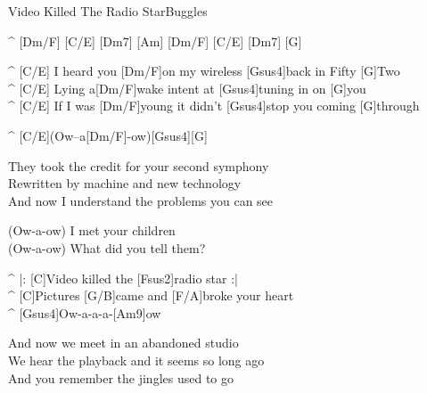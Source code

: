 \begin{song}{Video Killed The Radio Star}{Buggles}

\begin{guitar}
^ [Dm/F] [C/E] [Dm7] [Am] [Dm/F] [C/E] [Dm7] [G]\\

\end{guitar}
\begin{guitar}
^ [C/E] I heard you [Dm/F]on my wireless [Gsus4]back in Fifty [G]Two \\
^ [C/E] Lying a[Dm/F]wake intent at [Gsus4]tuning in on [G]you \\
^ [C/E] If I was [Dm/F]young it didn't [Gsus4]stop you coming [G]through \\
\end{guitar}

\begin{guitar}
^ [C/E](Ow–a[Dm/F]-ow)[Gsus4][G]\\
\end{guitar}

\begin{guitar}
They took the credit for your second symphony \\
Rewritten by machine and new technology\\
And now I understand the problems you can see \\
\end{guitar}

\begin{guitar}
(Ow-a-ow) I met your children \\
(Ow-a-ow) What did you tell them? \\
\end{guitar}

\begin{guitar}
^ |: [C]Video killed the [Fsus2]radio star :|\\
^ [C]Pictures [G/B]came and [F/A]broke your heart \\
^ [Gsus4]Ow-a-a-a-[Am9]ow\\
\end{guitar}

\begin{guitar}
And now we meet in an abandoned studio \\
We hear the playback and it seems so long ago \\
And you remember the jingles used to go \\
\end{guitar}


\end{song}
